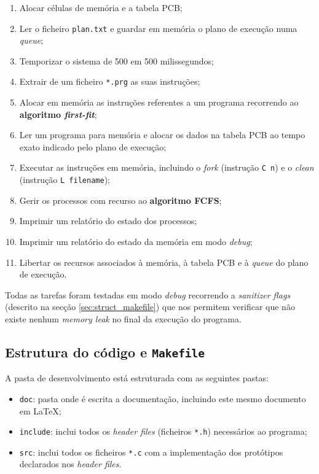 \documentclass[a4paper,11pt,onecolumn,oneside]{article}
\begin{document}
	\begin{enumerate}
		\item Alocar células de memória e a tabela PCB;
		\item Ler o ficheiro \texttt{plan.txt} e guardar em memória o plano de execução numa \textit{queue};
		\item Temporizar o sistema de 500 em 500 milissegundos;
		\item Extrair de um ficheiro \texttt{*.prg} as suas instruções;
		\item Alocar em memória as instruções referentes a um programa recorrendo ao \textbf{algoritmo \textit{first-fit}};
		\item Ler um programa para memória e alocar os dados na tabela PCB ao tempo exato indicado pelo plano de execução;
		\item Executar as instruções em memória, incluindo o \textit{fork} (instrução \verb|C n|) e o \textit{clean} (instrução \verb|L filename|);
		\item Gerir os processos com recurso ao \textbf{algoritmo FCFS};
		\item Imprimir um relatório do estado dos processos;
		\item Imprimir um relatório do estado da memória em modo \textit{debug};
		\item Libertar os recursos associados à memória, à tabela PCB e à \textit{queue} do plano de execução.
	\end{enumerate}
	
	Todas as tarefas foram testadas em modo \textit{debug} recorrendo a \textit{sanitizer flags} (descrito na secção \ref{sec:struct_makefile}) que nos permitem verificar que não existe nenhum \textit{memory leak} no final da execução do programa.
	
	
	\subsection{Estrutura do código e \texttt{Makefile}}
	\label{ssec:dev:struct_makefile}
	
	A pasta de desenvolvimento está estruturada com as seguintes pastas:
	
	\begin{itemize}
		\item \verb|doc|: pasta onde é escrita a documentação, incluindo este mesmo documento em \LaTeX;
		\item \verb|include|: inclui todos os \textit{header files} (ficheiros \verb|*.h|) necessários ao programa;
		\item \verb|src|: inclui todos os ficheiros \verb|*.c| com a implementação dos protótipos declarados nos \textit{header files}.
	\end{itemize}
	
\end{document}
